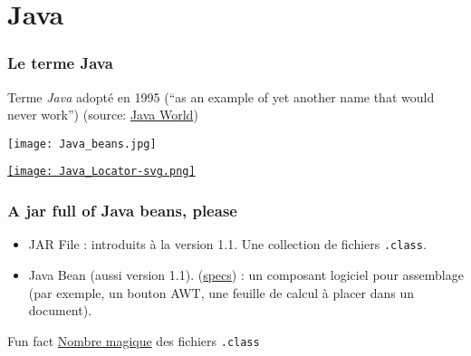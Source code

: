 \documentclass[english, french]{beamer}
\begin{document}
\section{Java}
\begin{frame}[fragile]
	\frametitle{Le terme Java}
	
	Terme \emph{Java} adopté en 1995 (“as an example of yet another name that would never work”) {\scriptsize{(source: \href{https://www.javaworld.com/article/2077265/so-why-did-they-decide-to-call-it-java-.html}{Java World})}}
	\hfill
	\vfill
	\begin{minipage}[b]{3cm}
		\texttt{[image: Java\_beans.jpg]}
	\end{minipage}%
	\begin{minipage}[b]{(\columnwidth - 3cm)}
		\href{https://en.wikipedia.org/wiki/Java}{\texttt{[image: Java\_Locator-svg.png]}}
	\end{minipage}
\end{frame}

\begin{frame}
	\frametitle{A jar full of Java beans, please}
	\begin{itemize}
		\item JAR File : introduits à la version 1.1. Une collection de fichiers \texttt{.class}.
		\item Java Bean (aussi version 1.1). (\href{https://www.oracle.com/technetwork/java/javase/documentation/spec-136004.html}{specs}) : un composant logiciel pour assemblage (par exemple, un bouton AWT, une feuille de calcul à placer dans un document).
	\end{itemize}
	\begin{block}{Fun fact}
		\href{https://en.wikipedia.org/wiki/Java_class_file\#Magic_Number}{Nombre magique} des fichiers \texttt{.class}
	\end{block}
\end{frame}
\end{document}
